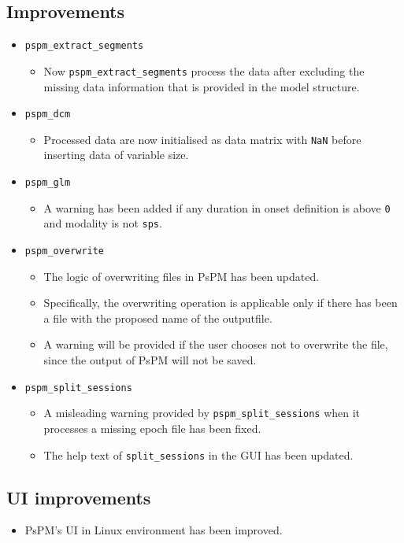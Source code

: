 \documentclass[english]{article}
\numberwithin{equation}{section}
\numberwithin{figure}{section}
\begin{document}
\subsection*{Improvements}
\begin{itemize}
\item \texttt{pspm\_extract\_segments}
\begin{itemize}
\item Now \texttt{pspm\_extract\_segments} process the data after excluding
the missing data information that is provided in the model structure.
\end{itemize}
\item \texttt{pspm\_dcm}
\begin{itemize}
\item Processed data are now initialised as data matrix with \texttt{NaN}
before inserting data of variable size.
\end{itemize}
\item \texttt{pspm\_glm}
\begin{itemize}
\item A warning has been added if any duration in onset definition is above
\texttt{0} and modality is not \texttt{sps}.
\end{itemize}
\item \texttt{pspm\_overwrite}
\begin{itemize}
\item The logic of overwriting files in PsPM has been updated.
\item Specifically, the overwriting operation is applicable only if there
has been a file with the proposed name of the outputfile.
\item A warning will be provided if the user chooses not to overwrite the
file, since the output of PsPM will not be saved. 
\end{itemize}
\item \texttt{pspm\_split\_sessions}
\begin{itemize}
\item A misleading warning provided by \texttt{pspm\_split\_sessions} when
it processes a missing epoch file has been fixed.
\item The help text of \texttt{split\_sessions} in the GUI has been updated.
\end{itemize}
\end{itemize}

\subsection*{UI improvements}
\begin{itemize}
\item PsPM's UI in Linux environment has been improved.
\end{itemize}



\end{document}
